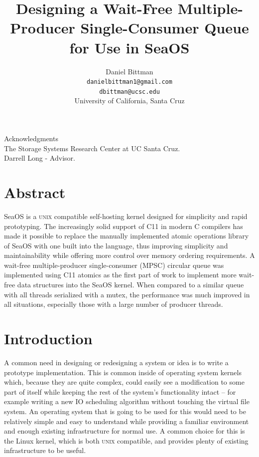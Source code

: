\documentclass[12pt]{article}
\begin{document}
\title{Designing a Wait-Free Multiple-Producer Single-Consumer Queue for Use in SeaOS}
\author{Daniel Bittman \\ \texttt{\small{danielbittman1@gmail.com}}\\\texttt{\small{dbittman@ucsc.edu}}\\
\large{University of California, Santa Cruz}}


\maketitle
\doublespacing
\clearpage

\begin{center}
	{\large Acknowledgments}\\
	The Storage Systems Research Center at UC Santa Cruz.\\
	Darrell Long - Advisor.
\end{center}

\clearpage

\section*{Abstract}

SeaOS is a \textsc{unix} compatible self-hosting kernel designed for simplicity and
rapid prototyping. The increasingly solid support of C11 in modern C compilers
has made it possible to replace the manually implemented atomic operations
library of SeaOS with one built into the language, thus improving simplicity
and maintainability while offering more control over memory ordering requirements.
A wait-free multiple-producer single-consumer (MPSC) circular queue was implemented using C11 atomics as the first
part of work to implement more wait-free data structures into the SeaOS kernel.
When compared to a similar queue with all threads serialized with a mutex, the
performance was much improved in all situations, especially those with a large
number of producer threads.

\clearpage
\singlespacing
\tableofcontents
\clearpage
\onehalfspacing
\listoffigures
\renewcommand{\lstlistlistingname}{List of Source Code Listings}
\lstlistoflistings
\doublespacing
\clearpage

\section{Introduction}

A common need in designing or redesigning a system or idea
is to write a prototype implementation.
This is common inside of operating system kernels which, because they are quite
complex, could easily see a modification to some part of itself while
keeping the rest of the system's functionality intact -- for example writing a new
IO scheduling algorithm without touching the virtual file system. An operating
system that is going to be used for this would need to be relatively simple
and easy to understand while
providing a familiar environment and enough existing infrastructure
for normal use. A common choice for this is the Linux kernel, which
is both \textsc{unix} compatible, and provides plenty of existing infrastructure to
be useful.
\end{document}

